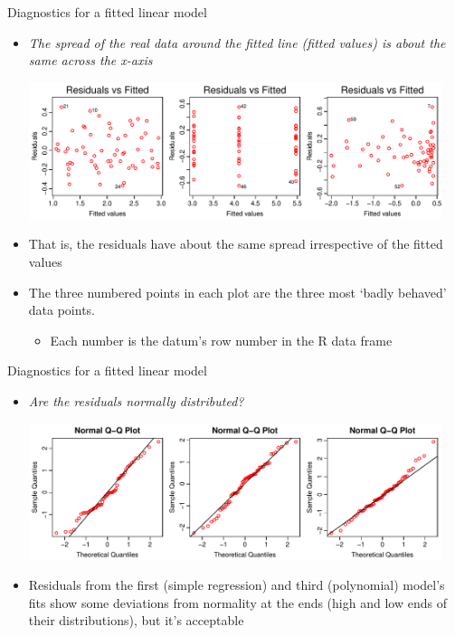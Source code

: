\documentclass[xcolor=x11names,compress]{beamer}
\renewcommand{\(}{\begin{columns}}
\renewcommand{\)}{\end{columns}}
\newcommand{\<}[1]{\begin{column}{#1}}
\renewcommand{\>}{\end{column}}
\begin{document}
\begin{frame}{Diagnostics for a fitted linear model}
        
\begin{itemize}[<+->]\itemsep6pt
    \item \it The spread of the real data around the fitted line (fitted values) is about the same across the x-axis\\ \pause
    
    \includegraphics[width=0.95\textwidth]{FitResid.pdf}

    \pause 
    \item That is, the residuals have about the same spread irrespective of the fitted values 
    \item The three numbered points in each plot are the three most `badly behaved' data points.
    \begin{itemize}
        \item Each number is the datum's row number in the R data frame 
    \end{itemize}
\end{itemize}

\end{frame}


\begin{frame}{Diagnostics for a fitted linear model}

\begin{itemize}[<+->]\itemsep6pt
    \item \it Are the residuals normally distributed?\\ \pause

    \includegraphics[width=0.95\textwidth]{QQNorm.pdf}

    \pause 
    \item Residuals from the first (simple regression) and third (polynomial) model's fits show some deviations from normality at the ends (high and low ends of their distributions), but it's acceptable
    \end{itemize}

\end{frame}
    
\end{document}
